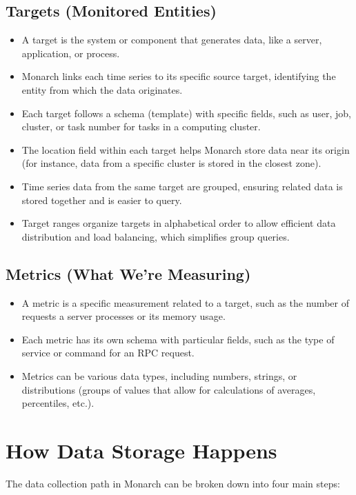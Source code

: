 \subsection*{Targets (Monitored Entities)}
\begin{itemize}
    \item A target is the system or component that generates data, like a server, application, or process.
    \item Monarch links each time series to its specific source target, identifying the entity from which the data originates.
    \item Each target follows a schema (template) with specific fields, such as user, job, cluster, or task number for tasks in a computing cluster.
    \item The location field within each target helps Monarch store data near its origin (for instance, data from a specific cluster is stored in the closest zone).
    \item Time series data from the same target are grouped, ensuring related data is stored together and is easier to query.
    \item Target ranges organize targets in alphabetical order to allow efficient data distribution and load balancing, which simplifies group queries.
\end{itemize}

\subsection*{Metrics (What We’re Measuring)}
\begin{itemize}
    \item A metric is a specific measurement related to a target, such as the number of requests a server processes or its memory usage.
    \item Each metric has its own schema with particular fields, such as the type of service or command for an RPC request.
    \item Metrics can be various data types, including numbers, strings, or distributions (groups of values that allow for calculations of averages, percentiles, etc.).
\end{itemize}

\section{How Data Storage Happens}

The data collection path in Monarch can be broken down into four main steps:

